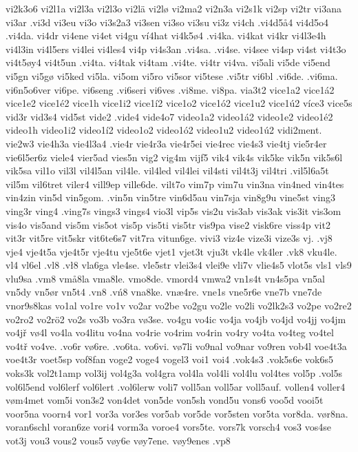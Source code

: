 {{vi2k3o6
vi2l1a
vi2l3a
vi2l3o
vi2lä
vi2lø
vi2ma2
vi2n3a
vi2s1k
vi2sp
vi2tr
vi3ana
vi3ar
.vi3d
vi3eu
vi3o
vi3s2a3
vi3sen
vi3so
vi3su
vi3z
vi4ch
.vi4d5å4
vi4d5o4
.vi4da.
vi4dr
vi4ene
vi4et
vi4gu
ví4hat
vi4k5ø4
.vi4ka.
vi4kat
vi4kr
vi4l3e4h
vi4l3in
vi4l5ers
vi4lei
vi4les4
vi4p
vi4s3an
.vi4sa.
.vi4se.
vi4see
vi4sp
vi4st
vi4t3o
vi4t5øy4
vi4t5un
.vi4ta.
vi4tak
vi4tam
.vi4te.
vi4tr
vi4va.
vi5ali
vi5de
vi5end
vi5gn
vi5gø
vi5ked
vi5la.
vi5om
vi5ro
vi5sor
vi5tese
.vi5tr
vi6bl
.vi6de.
.vi6ma.
vi6n5o6ver
vi6pe.
vi6seng
.vi6seri
vi6ves
.vi8me.
vi8pa.
via3t2
vice1a2
vice1á2
vice1e2
vice1é2
vice1h
vice1i2
vice1í2
vice1o2
vice1ó2
vice1u2
vice1ú2
více3
vice5s
vid3r
vid3s4
vid5st
vide2
.vide4
vide4o7
video1a2
video1á2
video1e2
video1é2
video1h
video1i2
video1í2
video1o2
video1ó2
video1u2
video1ú2
vidi2ment.
vie2w3
vie4h3a
vie4l3a4
.vie4r
vie4r3a
vie4r5ei
vie4rec
vie4s3
vie4tj
vie5r4er
vie6l5er6z
viele4
vier5ad
vies5n
vig2
vig4m
vijf5
vik4
vik4s
vik5ke
vik5n
vik5s6l
vik5sa
vil1o
vil3l
vil4l5an
vil4le.
vil4led
vil4lei
vil4sti
vil4t3j
vil4tri
.vil5l6a5t
vil5m
vil6tret
viler4
vill9ep
ville6de.
vilt7o
vim7p
vim7u
vin3na
vin4ned
vin4tes
vin4zin
vin5d
vin5gom.
.vin5n
vin5tre
vin6d5au
vin7sja
vin8g9u
vine5st
ving3
ving3r
ving4
.ving7s
vings3
vings4
vio3l
vip5s
vis2u
vis3ab
vis3ak
vis3it
vis3om
vis4o
vis5and
vis5m
vis5ot
vis5p
vis5ti
vis5tr
vis9pa
vise2
visk6re
viss4p
vit2
vit3r
vit5re
vit5skr
vit6te6s7
vit7ra
vitun6ge.
vivi3
viz4e
vize3i
vize3s
vj.
.vj8
vje4
vje4t5a
vje4t5r
vje4tu
vje5t6e
vjet1
vjet3t
vju3t
vk4le
vk4ler
.vk8
vku4le.
vl4
vl6el
.vl8
.vł8
vla6ga
vle4se.
vle5str
vlei3s4
vlei9e
vli7v
vlie4s5
vlot5s
vls1
vls9
vlu9sa
.vm8
vmå8la
vma8le.
vmo8de.
vmord4
vmwa2
vn1s4t
vn4s5pa
vn5al
vn5dy
vn5ør
vn5t4
.vn8
.vń8
vna8ke.
vnæ4re.
vne1s
vne5r6e
vne7b
vne7de
vnor9s8kas
vo1al
vo1re
vo1v
vo2ar
vo2be
vo2gu
vo2le
vo2li
vo2lk2s3
vo2pe
vo2re2
vo2ro2
vo2rö2
vo2s
vo3b
vo3ra
vø3se.
vo4gu
vo4ic
vo4ja
vo4jb
vo4jd
vo4jj
vo4jm
vo4jř
vø4l
vo4la
vo4litu
vo4na
vo4rie
vo4rim
vo4rin
vo4ry
vo4ta
vo4teg
vo4tel
vo4tř
vo4ve.
.vo6r
vø6re.
.vo6ta.
vo6vi.
vø7li
vo9nal
vo9nar
vo9ren
vob4l
voe4t3a
voe4t3r
voet5sp
vof8fan
voge2
voge4
vogel3
voi1
voi4
.vok4s3
.vok5s6e
vok6s5
voks3k
vol2t1amp
vol3ij
vol4g3a
vol4gra
vol4la
vol4li
vol4lu
vol4tes
vol5p
.vol5s
vol6l5end
vol6lerf
vol6lert
.vol6lerw
voli7
voll5an
voll5ar
voll5auf.
vollen4
voller4
vøm4met
vom5i
von3s2
von4det
von5de
von5sh
vond5u
vons6
voo5d
vooi5t
voor5na
voorn4
vor1
vor3a
vor3es
vor5ab
vor5de
vor5sten
vor5ta
vor8da.
vør8na.
voran6schl
voran6ze
vori4
vorm3a
voroe4
vors5te.
vors7k
vorsch4
vos3
vos4se
vot3j
vou3
vous2
vous5
vøy6e
vøy7ene.
vøy9enes
.vp8
}}
